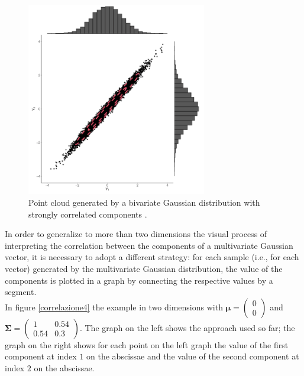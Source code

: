 \begin{figure}[h]
    \centering
    \includegraphics[width=0.7\textwidth]{images/Gaussiane/VettoreBivariatoIndipendenza3.png}
    \caption{Point cloud generated by a bivariate Gaussian distribution with strongly correlated components \cite{wilkinson_introduction_2020}.}
    \label{correlazione3}
\end{figure}



\newpage

In order to generalize to more than two dimensions the visual process of interpreting the correlation between the components of a multivariate Gaussian vector, it is necessary to adopt a different strategy: for each sample (i.e., for each vector) generated by the multivariate Gaussian distribution, the value of the components is plotted in a graph by connecting the respective values by a segment.\\
In figure \ref{correlazione4} the example in two dimensions with $\bm{\mu} = \begin{pmatrix}0\\0\end{pmatrix}$ and $\mathbf{\Sigma}=\begin{pmatrix}1&0.54\\0.54&0.3\end{pmatrix}$. The graph on the left shows the approach used so far; the graph on the right shows for each point on the left graph the value of the first component at index $1$ on the abscissae and the value of the second component at index $2$ on the abscissae.


